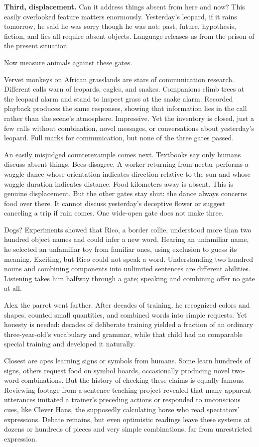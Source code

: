 \textbf{Third, displacement.} Can it address things absent from here and now? This easily overlooked feature matters enormously. Yesterday's leopard, if it rains tomorrow, he said he was sorry though he was not: past, future, hypothesis, fiction, and lies all require absent objects. Language releases us from the prison of the present situation.

Now measure animals against these gates.

Vervet monkeys on African grasslands are stars of communication research. Different calls warn of leopards, eagles, and snakes. Companions climb trees at the leopard alarm and stand to inspect grass at the snake alarm. Recorded playback produces the same responses, showing that information lies in the call rather than the scene's atmosphere. Impressive. Yet the inventory is closed, just a few calls without combination, novel messages, or conversations about yesterday's leopard. Full marks for communication, but none of the three gates passed.

An easily misjudged counterexample comes next. Textbooks say only humans discuss absent things. Bees disagree. A worker returning from nectar performs a waggle dance whose orientation indicates direction relative to the sun and whose waggle duration indicates distance. Food kilometers away is absent. This is genuine displacement. But the other gates stay shut: the dance always concerns food over there. It cannot discuss yesterday's deceptive flower or suggest canceling a trip if rain comes. One wide-open gate does not make three.

Dogs? Experiments showed that Rico, a border collie, understood more than two hundred object names and could infer a new word. Hearing an unfamiliar name, he selected an unfamiliar toy from familiar ones, using exclusion to guess its meaning. Exciting, but Rico could not speak a word. Understanding two hundred nouns and combining components into unlimited sentences are different abilities. Listening takes him halfway through a gate; speaking and combining offer no gate at all.

Alex the parrot went farther. After decades of training, he recognized colors and shapes, counted small quantities, and combined words into simple requests. Yet honesty is needed: decades of deliberate training yielded a fraction of an ordinary three-year-old's vocabulary and grammar, while that child had no comparable special training and developed it naturally.

Closest are apes learning signs or symbols from humans. Some learn hundreds of signs, others request food on symbol boards, occasionally producing novel two-word combinations. But the history of checking these claims is equally famous. Reviewing footage from a sentence-teaching project revealed that many apparent utterances imitated a trainer's preceding actions or responded to unconscious cues, like Clever Hans, the supposedly calculating horse who read spectators' expressions. Debate remains, but even optimistic readings leave these systems at dozens or hundreds of pieces and very simple combinations, far from unrestricted expression.

